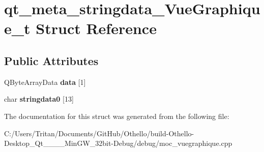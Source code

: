 \hypertarget{structqt__meta__stringdata___vue_graphique__t}{}\section{qt\+\_\+meta\+\_\+stringdata\+\_\+\+Vue\+Graphique\+\_\+t Struct Reference}
\label{structqt__meta__stringdata___vue_graphique__t}
\subsection*{Public Attributes}
\begin{DoxyCompactItemize}
\item 
\hypertarget{structqt__meta__stringdata___vue_graphique__t_a20175586d6de809e42b565a9f97bb33d}{}Q\+Byte\+Array\+Data {\bfseries data} \mbox{[}1\mbox{]}\label{structqt__meta__stringdata___vue_graphique__t_a20175586d6de809e42b565a9f97bb33d}

\item 
\hypertarget{structqt__meta__stringdata___vue_graphique__t_a0e678b4fc9a279b6e9ae0eaa7415517a}{}char {\bfseries stringdata0} \mbox{[}13\mbox{]}\label{structqt__meta__stringdata___vue_graphique__t_a0e678b4fc9a279b6e9ae0eaa7415517a}

\end{DoxyCompactItemize}


The documentation for this struct was generated from the following file\+:\begin{DoxyCompactItemize}
\item 
C\+:/\+Users/\+Tritan/\+Documents/\+Git\+Hub/\+Othello/build-\/\+Othello-\/\+Desktop\+\_\+\+Qt\+\_\+\_\+\_\+\_\+\+Min\+G\+W\+\_\+32bit-\/\+Debug/debug/moc\+\_\+vuegraphique.\+cpp\end{DoxyCompactItemize}
